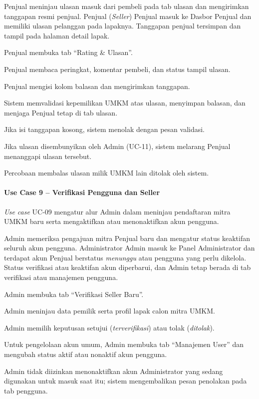 {Penjual meninjau ulasan masuk dari pembeli pada tab ulasan dan mengirimkan tanggapan resmi penjual.}
{Penjual (\textit{Seller})}
{Penjual masuk ke Dasbor Penjual dan memiliki ulasan pelanggan pada lapaknya.}
{Tanggapan penjual tersimpan dan tampil pada halaman detail lapak.}
{\begin{uclist}
  \item Penjual membuka tab ``Rating \& Ulasan''.
  \item Penjual membaca peringkat, komentar pembeli, dan status tampil ulasan.
  \item Penjual mengisi kolom balasan dan mengirimkan tanggapan.
  \item Sistem memvalidasi kepemilikan UMKM atas ulasan, menyimpan balasan, dan menjaga Penjual tetap di tab ulasan.
\end{uclist}}
{\begin{ucbullet}
  \item Jika isi tanggapan kosong, sistem menolak dengan pesan validasi.
  \item Jika ulasan disembunyikan oleh Admin (UC-11), sistem melarang Penjual menanggapi ulasan tersebut.
  \item Percobaan membalas ulasan milik UMKM lain ditolak oleh sistem.
\end{ucbullet}}

\paragraph{Use Case 9 -- Verifikasi Pengguna dan Seller}
\textit{Use case} UC-09 mengatur alur Admin dalam meninjau pendaftaran mitra UMKM baru serta mengaktifkan atau menonaktifkan akun pengguna.

{Admin memeriksa pengajuan mitra Penjual baru dan mengatur status keaktifan seluruh akun pengguna.}
{Administrator}
{Admin masuk ke Panel Administrator dan terdapat akun Penjual berstatus \textit{menunggu} atau pengguna yang perlu dikelola.}
{Status verifikasi atau keaktifan akun diperbarui, dan Admin tetap berada di tab verifikasi atau manajemen pengguna.}
{\begin{uclist}
  \item Admin membuka tab ``Verifikasi Seller Baru''.
  \item Admin meninjau data pemilik serta profil lapak calon mitra UMKM.
  \item Admin memilih keputusan setujui (\textit{terverifikasi}) atau tolak (\textit{ditolak}).
  \item Untuk pengelolaan akun umum, Admin membuka tab ``Manajemen User'' dan mengubah status aktif atau nonaktif akun pengguna.
\end{uclist}}
{\begin{ucbullet}
  \item Admin tidak diizinkan menonaktifkan akun Administrator yang sedang digunakan untuk masuk saat itu; sistem mengembalikan pesan penolakan pada tab pengguna.
\end{ucbullet}}

